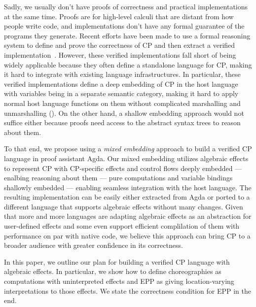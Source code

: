 Sadly, we usually don't have proofs of correctness and practical implementations at the same time.
%
Proofs are for high-level calculi that are distant from how people write code, and implementations don't have any formal guarantee of the programs they generate.
%
Recent efforts have been made to use a formal reasoning system to define and prove the correctness of CP and then extract a verified implementation~\citep{pohjola-2022, cruzfillipe-2023}.
%
However, these verified implementations fall short of being widely applicable because they often define a standalone language for CP, making it hard to integrate with existing language infrastructures.
%
In particular, these verified implementations define a deep embedding of CP in the host language with variables being in a separate semantic category, making it hard to apply normal host language functions on them without complicated marshalling and unmarshalling ().
%
On the other hand, a shallow embedding approach would not suffice either because proofs need access to the abstract syntax trees to reason about them.

To that end, we propose using a \emph{mixed embedding} approach to build a verified CP language in proof assistant Agda.
%
Our mixed embedding utilizes algebraic effects to represent CP with CP-specific effects and control flows deeply embedded --- enalbing reasoning about them --- pure computations and variable bindings shallowly embedded --- enabling seamless integration with the host language.
%
The resulting implementation can be easily either extracted from Agda or ported to a different language that supports algebraic effects without many changes.
%
Given that more and more languages are adapting algebraic effects as an abstraction for user-defined effects and some even support efficient complilation of them with performance on par with native code, we believe this approach can bring CP to a broader audience with greater confidence in its correctness.

In this paper, we outline our plan for building a verified CP language with algebraic effects.
%
In particular, we show how to define choreographies as computations with uninterpreted effects and EPP as giving location-varying interpretations to those effects.
%
We state the correctness condition for EPP in the end.
